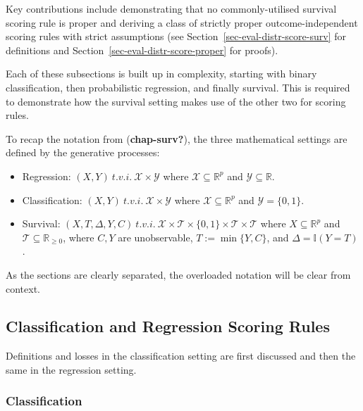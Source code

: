 \documentclass[
  letterpaper,
]{scrbook}
\providecommand{\tightlist}{%
  \setlength{\itemsep}{0pt}\setlength{\parskip}{0pt}}\usepackage{longtable,booktabs,array}
\theoremstyle{plain}
\theoremstyle{definition}
\theoremstyle{remark}
\begin{document}
Key contributions include demonstrating that no commonly-utilised
survival scoring rule is proper and deriving a class of strictly proper
outcome-independent scoring rules with strict assumptions (see
Section~\ref{sec-eval-distr-score-surv} for definitions and
Section~\ref{sec-eval-distr-score-proper} for proofs).

Each of these subsections is built up in complexity, starting with
binary classification, then probabilistic regression, and finally
survival. This is required to demonstrate how the survival setting makes
use of the other two for scoring rules.

To recap the notation from (\textbf{chap-surv?}), the three mathematical
settings are defined by the generative processes:

\begin{itemize}
\tightlist
\item
  Regression: \((X,Y) \ t.v.i. \ \mathcal{X}\times \mathcal{Y}\) where
  \(\mathcal{X}\subseteq \mathbb{R}^p\) and
  \(\mathcal{Y}\subseteq \mathbb{R}\).
\item
  Classification: \((X,Y) \ t.v.i. \ \mathcal{X}\times \mathcal{Y}\)
  where \(\mathcal{X}\subseteq \mathbb{R}^p\) and
  \(\mathcal{Y}= \{0,1\}\).
\item
  Survival:
  \((X,T,\Delta,Y,C) \ t.v.i. \ \mathcal{X}\times \mathcal{T}\times \{0,1\}\times \mathcal{T}\times \mathcal{T}\)
  where \(X \subseteq \mathbb{R}^p\) and
  \(\mathcal{T}\subseteq \mathbb{R}_{\geq 0}\), where \(C,Y\) are
  unobservable, \(T := \min\{Y,C\}\), and
  \(\Delta = \mathbb{I}(Y = T)\).
\end{itemize}

As the sections are clearly separated, the overloaded notation will be
clear from context.

\hypertarget{sec-eval-distr-score-reg}{%
\subsection{Classification and Regression Scoring
Rules}\label{sec-eval-distr-score-reg}}

Definitions and losses in the classification setting are first discussed
and then the same in the regression setting.

\hypertarget{classification}{%
\subsubsection{Classification}\label{classification}}
\end{document}
